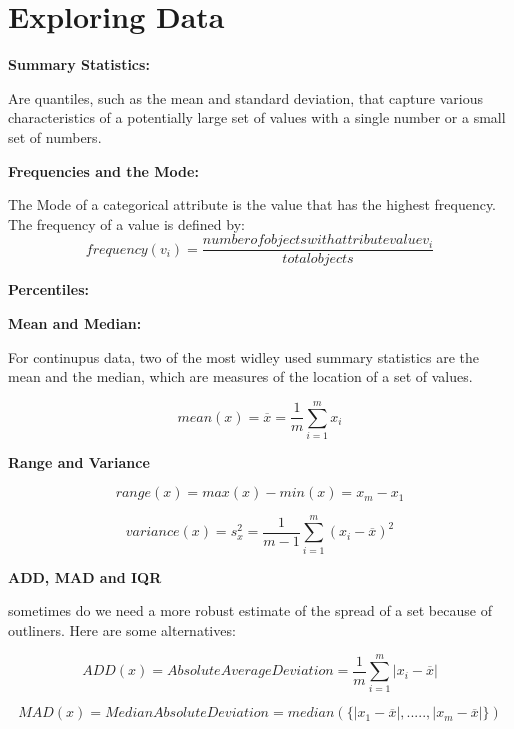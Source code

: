 \chapter{Exploring Data}
	
	\clearpage
	{\bf Summary Statistics:} 

	Are quantiles, such as the mean
	and standard deviation, that capture various characteristics of a 
	potentially large set of values with a single number or a small set
	of numbers. 

	{\bf Frequencies and the Mode:} 

	The Mode of a categorical attribute is the value that has the highest frequency.
	The frequency of a value is defined by:	
	\begin{equation}
		frequency(v_{i}) = \frac{number of objects with attribute value v_{i}}{total objects}
	\end{equation}  

	{\bf Percentiles:}

	{\bf Mean and Median:}

	For continupus data, two of the most widley used summary statistics are the mean
	and the median, which are measures of the location of a set of values.

	\begin{equation}
		mean(x) = \overline{x} = \frac{1}{m} \sum_{i=1}^{m} x_i
	\end{equation}

	{\bf Range and Variance}

	\begin{equation}
		range(x) = max(x) - min(x) = x_{m} - x_{1}
	\end{equation}	

	\begin{equation}
		variance(x) = s_{x}^{2} = \frac{1}{m - 1}\sum_{i=1}^{m} (x_{i} - \overline{x})^{2}
	\end{equation}	

	{\bf ADD, MAD and IQR}

	sometimes do we need a more robust estimate of the spread of a set because of outliners.
	Here are some alternatives:

		\begin{equation}
			ADD(x) = Absolute Average Deviation = \frac{1}{m} \sum_{i=1}^{m} |x_{i} - \overline{x}|
		\end{equation}

		\begin{equation}
			MAD(x) = Median Absolute Deviation = median (\{|x_{1} -\overline{x}|, ..... , 
			|x_{m} -\overline{x}|\})
		\end{equation}

